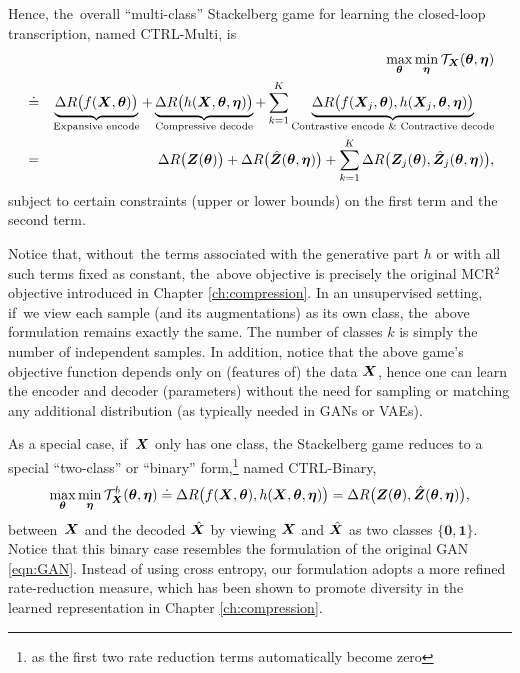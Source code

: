 \documentclass[../../book-main.tex]{subfiles}
\begin{document}
Hence, the~overall ``multi-class''  Stackelberg game for learning the closed-loop transcription, named CTRL-Multi, is
\begin{eqnarray}
&&\max_{\bm \theta} \min_{\bm \eta} \mathcal{T}_{\bm{X}}(\bm \theta, \bm \eta) \\
&\doteq& \underbrace{\Delta R\big(f(\bm{X},\bm \theta)\big)}_{\text{Expansive encode}} + \underbrace{\Delta R\big(h(\bm{X},\bm \theta, \bm \eta)\big)}_{\text{Compressive decode}} + \sum_{k=1}^K \underbrace{\Delta R\big(f(\bm{X}_j,\bm \theta), h(\bm{X}_j,\bm \theta,\bm \eta)\big)}_{\text{Contrastive encode \& Contractive decode}} \nonumber \\
&=& \Delta R\big(\bm{Z}(\bm \theta) \big) + \Delta R\big(\hat {\bm{Z}}(\bm \theta, \bm \eta)\big) + \sum_{k=1}^K \Delta R\big(\bm{Z}_j(
\bm \theta), \hat {\bm{Z}}_j(\bm \theta, \bm \eta) \big),
    \label{eq:MCR2-GAN-objective}
\end{eqnarray}
subject to certain constraints (upper or lower bounds) on the first term and the second term.  %



Notice that, without~the terms associated with the generative part $h$ or with all such terms fixed as constant, the~above objective is precisely the original MCR$^2$ objective introduced in Chapter \ref{ch:compression}. In an unsupervised setting, if~we view each sample (and its augmentations) as its own class, the~above formulation remains exactly the same. The number of classes $k$ is simply the number of independent samples. In addition, notice that the above game's objective function depends only on (features of) the data $\bm{X}$, hence one can learn the encoder and decoder (parameters) without the need for sampling or matching any additional distribution (as typically needed in GANs or VAEs).

As a special case, if~$\bm{X}$ only has one class, the Stackelberg game reduces to a special ``two-class'' or ``binary''  form,\footnote{as the first two rate reduction terms automatically become zero} named CTRL-Binary, 
\begin{equation}
 \max_{\bm \theta} \min_{\bm \eta} \mathcal{T}^b_{\bm{X}}(\bm \theta, \bm \eta) \doteq \Delta R\big(f(\bm{X},\bm \theta), h(\bm{X},\bm \theta,\bm \eta)\big) = \Delta R\big(\bm{Z}(\bm \theta), \hat {\bm{Z}}(\bm \theta, \bm \eta)\big), 
    \label{eq:MCR2-GAN-objective-binary}
\end{equation}
between~$\bm{X}$ and the decoded $\hat{\bm{X}}$ by viewing $\bm{X}$ and $\hat {\bm{X}}$ as two classes $\{\bm 0, \bm 1\}$. Notice that this binary case resembles the formulation of the original GAN \eqref{eqn:GAN}. Instead of using cross entropy, our formulation adopts a more refined rate-reduction measure, which has been shown to promote diversity in the learned representation in Chapter \ref{ch:compression}. %
\end{document}
